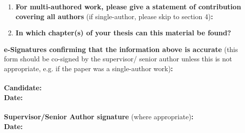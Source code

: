 \begin{enumerate}
\item \textbf{For multi-authored work, please give a statement of contribution covering all authors} (if single-author, please skip to section 4)\textbf{:}
\item \textbf{In which chapter(s) of your thesis can this material be found?}
%
\end{enumerate}

\textbf{e-Signatures confirming that the information above is accurate}
(this form should be co-signed by the supervisor/ senior author unless this is not appropriate, e.g. if the paper was a single-author work)\textbf{:}\\
\textbf{}\\
\textbf{Candidate:}\\
\textbf{Date:}\\
\textbf{}\\
\textbf{Supervisor/Senior Author signature} (where appropriate)\textbf{:}\\
\textbf{Date:}
%


% 
